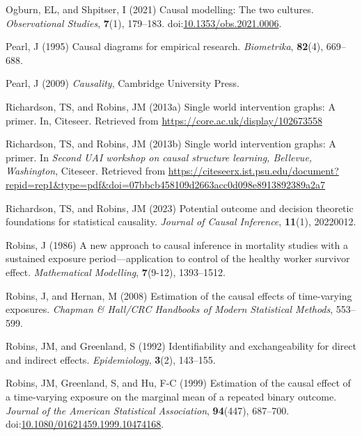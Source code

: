 \documentclass[
  single column]{article}
\newlength{\cslhangindent}
\newenvironment{CSLReferences}[2] %
 {\begin{list}{}{%
  \setlength{\itemindent}{0pt}
  \setlength{\leftmargin}{0pt}
  \setlength{\parsep}{0pt}
  \ifodd #1
   \setlength{\leftmargin}{\cslhangindent}
   \setlength{\itemindent}{-1\cslhangindent}
  \fi
  \setlength{\itemsep}{#2\baselineskip}}}
 {\end{list}}
\begin{document}
\begin{CSLReferences}{1}{0}
Ogburn, EL, and Shpitser, I (2021) Causal modelling: The two cultures.
\emph{Observational Studies}, \textbf{7}(1), 179--183.
doi:\href{https://doi.org/10.1353/obs.2021.0006}{10.1353/obs.2021.0006}.

Pearl, J (1995) Causal diagrams for empirical research.
\emph{Biometrika}, \textbf{82}(4), 669--688.

Pearl, J (2009) \emph{Causality}, Cambridge University Press.

Richardson, TS, and Robins, JM (2013a) Single world intervention graphs:
A primer. In, Citeseer. Retrieved from
\url{https://core.ac.uk/display/102673558}

Richardson, TS, and Robins, JM (2013b) Single world intervention graphs:
A primer. In \emph{Second UAI workshop on causal structure learning,
{B}ellevue, {W}ashington}, Citeseer. Retrieved from
\url{https://citeseerx.ist.psu.edu/document?repid=rep1&type=pdf&doi=07bbcb458109d2663acc0d098e8913892389a2a7}

Richardson, TS, and Robins, JM (2023) Potential outcome and decision
theoretic foundations for statistical causality. \emph{Journal of Causal
Inference}, \textbf{11}(1), 20220012.

Robins, J (1986) A new approach to causal inference in mortality studies
with a sustained exposure period---application to control of the healthy
worker survivor effect. \emph{Mathematical Modelling}, \textbf{7}(9-12),
1393--1512.

Robins, J, and Hernan, M (2008) Estimation of the causal effects of
time-varying exposures. \emph{Chapman \& Hall/CRC Handbooks of Modern
Statistical Methods}, 553--599.

Robins, JM, and Greenland, S (1992) Identifiability and exchangeability
for direct and indirect effects. \emph{Epidemiology}, \textbf{3}(2),
143--155.

Robins, JM, Greenland, S, and Hu, F-C (1999) Estimation of the causal
effect of a time-varying exposure on the marginal mean of a repeated
binary outcome. \emph{Journal of the American Statistical Association},
\textbf{94}(447), 687--700.
doi:\href{https://doi.org/10.1080/01621459.1999.10474168}{10.1080/01621459.1999.10474168}.


\end{CSLReferences}
\end{document}
